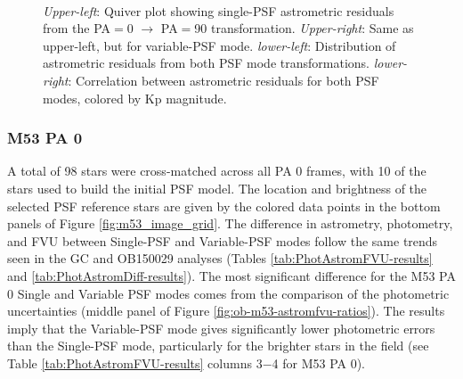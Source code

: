\documentclass[]{spie}  %
\begin{document}
\begin{figure}[!h]
  \centering
  \\
  \hspace{-1cm}
  \caption{\textit{Upper-left}: Quiver plot showing single-PSF astrometric residuals from the PA$=$0 $\rightarrow$ PA$=$90 transformation. \textit{Upper-right}: Same as upper-left, but for variable-PSF mode. \textit{lower-left}: Distribution of astrometric residuals from both PSF mode transformations. \textit{lower-right}: Correlation between astrometric residuals for both PSF modes, colored by Kp magnitude.} \label{fig:m53_PA_compare}
\end{figure}

\subsubsection{M53 PA 0} \label{sec:result-m53-pa0}
A total of 98 stars were cross-matched across all PA 0 frames, with 10 of the stars used to build the initial PSF model. The location and brightness of the selected PSF reference stars are given by the colored data points in the bottom panels of Figure \ref{fig:m53_image_grid}. The difference in astrometry, photometry, and FVU between Single-PSF and Variable-PSF modes follow the same trends seen in the GC and OB150029 analyses (Tables \ref{tab:PhotAstromFVU-results} and \ref{tab:PhotAstromDiff-results}). The most significant difference for the M53 PA 0 Single and Variable PSF modes comes from the comparison of the photometric uncertainties (middle panel of Figure \ref{fig:ob-m53-astromfvu-ratios}). The results imply that the Variable-PSF mode gives significantly lower photometric errors than the Single-PSF mode, particularly for the brighter stars in the field (see Table \ref{tab:PhotAstromFVU-results} columns 3$-$4 for M53 PA 0).
\end{document}
